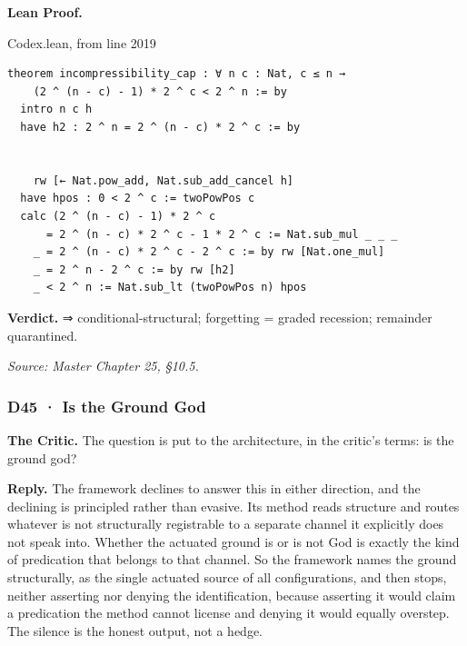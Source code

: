 \documentclass[10pt,twocolumn]{article}
\begin{document}
\textbf{Lean Proof.}

\begin{leanexcerpt}{Codex.lean, from line 2019}
\begin{lstlisting}[style=leanx,firstnumber=2019]
theorem incompressibility_cap : ∀ n c : Nat, c ≤ n →
    (2 ^ (n - c) - 1) * 2 ^ c < 2 ^ n := by
  intro n c h
  have h2 : 2 ^ n = 2 ^ (n - c) * 2 ^ c := by
    
    
    rw [← Nat.pow_add, Nat.sub_add_cancel h]
  have hpos : 0 < 2 ^ c := twoPowPos c
  calc (2 ^ (n - c) - 1) * 2 ^ c
      = 2 ^ (n - c) * 2 ^ c - 1 * 2 ^ c := Nat.sub_mul _ _ _
    _ = 2 ^ (n - c) * 2 ^ c - 2 ^ c := by rw [Nat.one_mul]
    _ = 2 ^ n - 2 ^ c := by rw [h2]
    _ < 2 ^ n := Nat.sub_lt (twoPowPos n) hpos
\end{lstlisting}
\end{leanexcerpt}

\textbf{Verdict.} ⇒ conditional-structural; forgetting = graded
recession; remainder quarantined.

\emph{Source: Master Chapter 25, §10.5.}

\hypertarget{d45-is-the-ground-god}{%
\subsubsection{D45 · Is the Ground God}\label{d45-is-the-ground-god}}

\textbf{The Critic.} The question is put to the architecture, in the
critic's terms: is the ground god?

\textbf{Reply.} The framework declines to answer this in either
direction, and the declining is principled rather than evasive. Its
method reads structure and routes whatever is not structurally
registrable to a separate channel it explicitly does not speak into.
Whether the actuated ground is or is not God is exactly the kind of
predication that belongs to that channel. So the framework names the
ground structurally, as the single actuated source of all
configurations, and then stops, neither asserting nor denying the
identification, because asserting it would claim a predication the
method cannot license and denying it would equally overstep. The silence
is the honest output, not a hedge.
\end{document}
